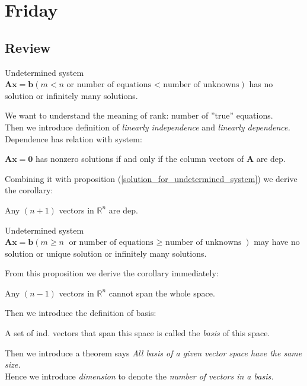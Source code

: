 

\section{Friday}
\subsection{Review}
\begin{proposition}\label{solution_for_undetermined_system}
Undetermined system $\bm{Ax} = \bm b (m<n\text{ or number of equations < number of unknowns})$ has no solution or infinitely many solutions.
\end{proposition}
We want to understand the meaning of rank: number of ''true'' equations. \\Then we introduce definition of \textit{linearly independence} and \textit{linearly dependence.}\\
Dependence has relation with system:
\begin{proposition}
$\bm{Ax} = \bm 0$ has nonzero solutions if and only if the column vectors of $\bm A$ are dep.
\end{proposition}
Combining it with proposition  (\ref{solution_for_undetermined_system}) we derive the corollary:
\begin{corollary}
Any $(n+1)$ vectors in $\mathbb{R}^{n}$ are dep.
\end{corollary}
\begin{proposition}
Undetermined system $\bm{Ax} = \bm b (m\ge n\text{ or number of equations $\ge$ number of unknowns})$ may have no solution or unique solution or infinitely many solutions.
\end{proposition}
From this proposition we derive the corollary immediately:
\begin{corollary}
Any $(n-1)$ vectors in $\mathbb{R}^{n}$ cannot span the whole space.
\end{corollary}
Then we introduce the definition of basis:
\begin{definition}[Basis]
A set of ind. vectors that span this space is called the \emph{basis} of this space.
\end{definition}
Then we introduce a theorem says \emph{All basis of a given vector space have the same size.}\\
Hence we introduce \emph{dimension} to denote the \textit{number of vectors in a basis.}
